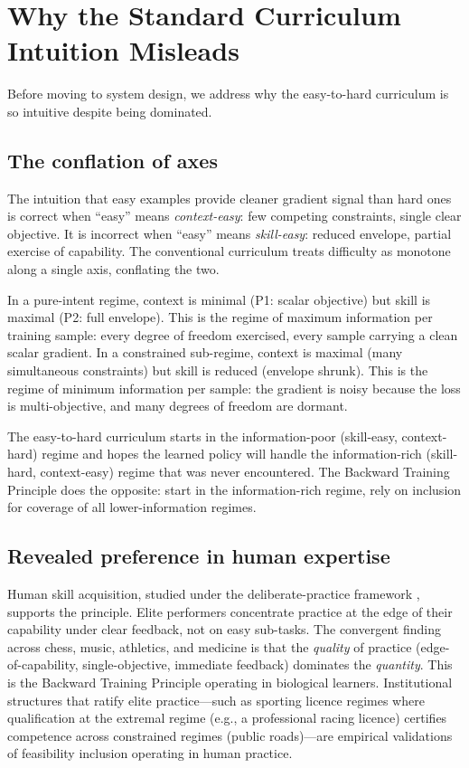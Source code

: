 \documentclass[twocolumn,11pt,a4paper]{article}
\begin{document}
\section{Why the Standard Curriculum Intuition Misleads}
\label{sec:curriculum-misleads}

Before moving to system design, we address why the easy-to-hard curriculum is so intuitive despite being dominated.

\subsection{The conflation of axes}

The intuition that easy examples provide cleaner gradient signal than hard ones is correct when ``easy'' means \emph{context-easy}: few competing constraints, single clear objective. It is incorrect when ``easy'' means \emph{skill-easy}: reduced envelope, partial exercise of capability. The conventional curriculum treats difficulty as monotone along a single axis, conflating the two.

In a pure-intent regime, context is minimal (P1: scalar objective) but skill is maximal (P2: full envelope). This is the regime of maximum information per training sample: every degree of freedom exercised, every sample carrying a clean scalar gradient. In a constrained sub-regime, context is maximal (many simultaneous constraints) but skill is reduced (envelope shrunk). This is the regime of minimum information per sample: the gradient is noisy because the loss is multi-objective, and many degrees of freedom are dormant.

The easy-to-hard curriculum starts in the information-poor (skill-easy, context-hard) regime and hopes the learned policy will handle the information-rich (skill-hard, context-easy) regime that was never encountered. The Backward Training Principle does the opposite: start in the information-rich regime, rely on inclusion for coverage of all lower-information regimes.

\subsection{Revealed preference in human expertise}

Human skill acquisition, studied under the deliberate-practice framework \citep{ericsson1993deliberate,ericsson2006cambridge}, supports the principle. Elite performers concentrate practice at the edge of their capability under clear feedback, not on easy sub-tasks. The convergent finding across chess, music, athletics, and medicine is that the \emph{quality} of practice (edge-of-capability, single-objective, immediate feedback) dominates the \emph{quantity}. This is the Backward Training Principle operating in biological learners. Institutional structures that ratify elite practice---such as sporting licence regimes where qualification at the extremal regime (e.g., a professional racing licence) certifies competence across constrained regimes (public roads)---are empirical validations of feasibility inclusion operating in human practice.
\end{document}
